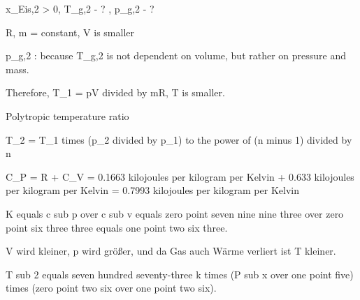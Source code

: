 x_{Eis,2} > 0, T_{g,2} - ? , p_{g,2} - ?

R, m = constant, V is smaller

p_{g,2} : because T_{g,2} is not dependent on volume, but rather on pressure and mass.

Therefore, T_{1} = pV divided by mR, T is smaller.

Polytropic temperature ratio

T_{2} = T_{1} times (p_{2} divided by p_{1}) to the power of (n minus 1) divided by n

C_{P} = R + C_{V} = 0.1663 kilojoules per kilogram per Kelvin + 0.633 kilojoules per kilogram per Kelvin = 0.7993 kilojoules per kilogram per Kelvin

K equals c sub p over c sub v equals zero point seven nine nine three over zero point six three three equals one point two six three.

V wird kleiner, p wird größer, und da Gas auch Wärme verliert ist T kleiner.

T sub 2 equals seven hundred seventy-three k times (P sub x over one point five) times (zero point two six over one point two six).